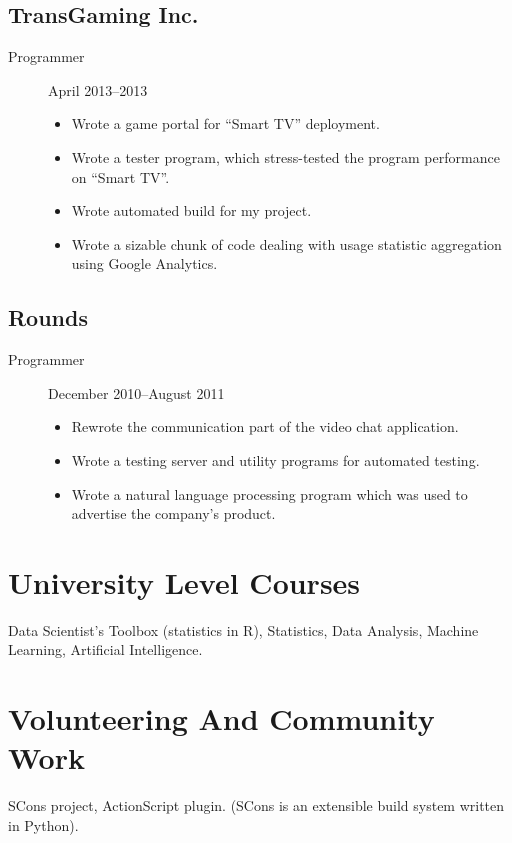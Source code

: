\documentclass[11pt]{article}
\begin{document}
\subsection*{TransGaming Inc.}
\label{sec-2-5}
\begin{description}
\item[{Programmer}] April 2013--2013
\begin{itemize}
\item Wrote a game portal for ``Smart TV'' deployment.
\item Wrote a tester program, which stress-tested the program
performance on ``Smart TV''.
\item Wrote automated build for my project.
\item Wrote a sizable chunk of code dealing with usage statistic
aggregation using Google Analytics.
\end{itemize}
\end{description}

\subsection*{Rounds}
\label{sec-2-6}
\begin{description}
\item[{Programmer}] December 2010--August 2011
\begin{itemize}
\item Rewrote the communication part of the video chat application.
\item Wrote a testing server and utility programs for automated
testing.
\item Wrote a natural language processing program which was used
to advertise the company's product.
\end{itemize}
\end{description}

\section*{University Level Courses}
\label{sec-3}
Data Scientist's Toolbox (statistics in R), Statistics, Data
Analysis, Machine Learning, Artificial Intelligence.

\section*{Volunteering And Community Work}
\label{sec-4}
SCons project, ActionScript plugin.  (SCons is an extensible build system
written in Python).
\end{document}
